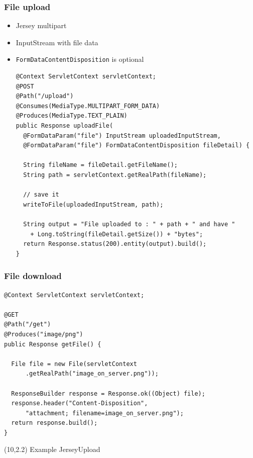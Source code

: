 \documentclass[10pt,xcolor=pdflatex]{beamer}
\begin{document}
\begin{frame}[containsverbatim]\frametitle{File upload}
\begin{itemize}
	\item Jersey multipart
	\item InputStream with file data
	\item \texttt{FormDataContentDisposition} is optional
	\vspace*{0.4cm}
    \begin{footnotesize}
    \begin{verbatim}
@Context ServletContext servletContext;
@POST
@Path("/upload")
@Consumes(MediaType.MULTIPART_FORM_DATA)
@Produces(MediaType.TEXT_PLAIN)
public Response uploadFile(
  @FormDataParam("file") InputStream uploadedInputStream,
  @FormDataParam("file") FormDataContentDisposition fileDetail) {
 
  String fileName = fileDetail.getFileName();
  String path = servletContext.getRealPath(fileName);
 
  // save it
  writeToFile(uploadedInputStream, path);
 
  String output = "File uploaded to : " + path + " and have " 
    + Long.toString(fileDetail.getSize()) + "bytes";
  return Response.status(200).entity(output).build();
}
    \end{verbatim}
    \end{footnotesize}
\end{itemize}
\end{frame}


\begin{frame}[containsverbatim]\frametitle{File download}
\begin{footnotesize}
\begin{verbatim}
@Context ServletContext servletContext;
 
@GET
@Path("/get")
@Produces("image/png")
public Response getFile() {
 
  File file = new File(servletContext
      .getRealPath("image_on_server.png"));
 
  ResponseBuilder response = Response.ok((Object) file);
  response.header("Content-Disposition",
      "attachment; filename=image_on_server.png");
  return response.build();
}
\end{verbatim}
\end{footnotesize}
\begin{textblock}{5}(10,2.2)
    {\footnotesize Example JerseyUpload}
\end{textblock}
\end{frame}
\end{document}
